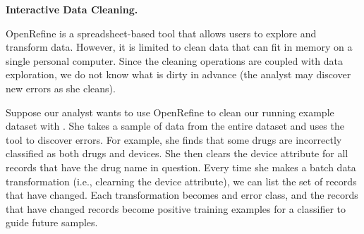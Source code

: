 \noindent\textbf{Interactive Data Cleaning.}
\begin{example}
OpenRefine is a spreadsheet-based tool that allows users to explore and transform data.
However, it is limited to clean data that can fit in memory on a single personal computer.
Since the cleaning operations are coupled with data exploration, we do not know what is dirty in advance (the analyst may discover new errors as she cleans).

Suppose our analyst wants to use OpenRefine to clean our running example dataset with \sys.
She takes a sample of data from the entire dataset and uses the tool to discover errors.
For example, she finds that some drugs are incorrectly classified as both drugs and devices.
She then clears the device attribute for all records that have the drug name in question.
Every time she makes a batch data transformation (i.e., clearning the device attribute), we can list the set of records that have changed.
Each transformation becomes and error class, and the records that have changed records become positive training examples for a classifier to guide future samples.
\end{example}